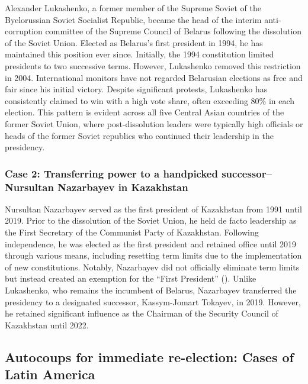 \documentclass[
  12pt,
]{report}
\begin{document}
Alexander Lukashenko, a former member of the Supreme Soviet of the
Byelorussian Soviet Socialist Republic, became the head of the interim
anti-corruption committee of the Supreme Council of Belarus following
the dissolution of the Soviet Union. Elected as Belarus's first
president in 1994, he has maintained this position ever since.
Initially, the 1994 constitution limited presidents to two successive
terms. However, Lukashenko removed this restriction in 2004.
International monitors have not regarded Belarusian elections as free
and fair since his initial victory. Despite significant protests,
Lukashenko has consistently claimed to win with a high vote share, often
exceeding 80\% in each election. This pattern is evident across all five
Central Asian countries of the former Soviet Union, where
post-dissolution leaders were typically high officials or heads of the
former Soviet republics who continued their leadership in the
presidency.

\subsubsection*{Case 2: Transferring power to a handpicked
successor--Nursultan Nazarbayev in
Kazakhstan}\label{case-2-transferring-power-to-a-handpicked-successornursultan-nazarbayev-in-kazakhstan}

Nursultan Nazarbayev served as the first president of Kazakhstan from
1991 until 2019. Prior to the dissolution of the Soviet Union, he held
de facto leadership as the First Secretary of the Communist Party of
Kazakhstan. Following independence, he was elected as the first
president and retained office until 2019 through various means,
including resetting term limits due to the implementation of new
constitutions. Notably, Nazarbayev did not officially eliminate term
limits but instead created an exemption for the ``First President''
(). Unlike
Lukashenko, who remains the incumbent of Belarus, Nazarbayev transferred
the presidency to a designated successor, Kassym-Jomart Tokayev, in
2019. However, he retained significant influence as the Chairman of the
Security Council of Kazakhstan until 2022.

\subsection{Autocoups for immediate re-election: Cases of Latin
America}\label{autocoups-for-immediate-re-election-cases-of-latin-america}
\end{document}
